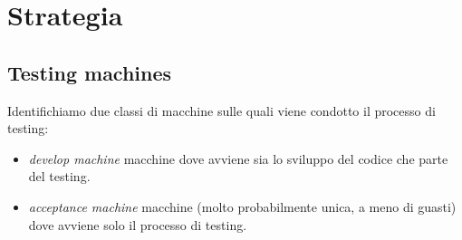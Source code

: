 \section{Strategia}

\subsection{Testing machines}
Identifichiamo due classi di macchine sulle quali viene condotto il processo di
testing:
\begin{itemize}
  \item \emph{develop machine} macchine dove avviene sia lo sviluppo del codice
  che parte del testing.
  \item \emph{acceptance machine} macchine (molto probabilmente unica, a meno
  di guasti) dove avviene solo il processo di testing.
\end{itemize}

